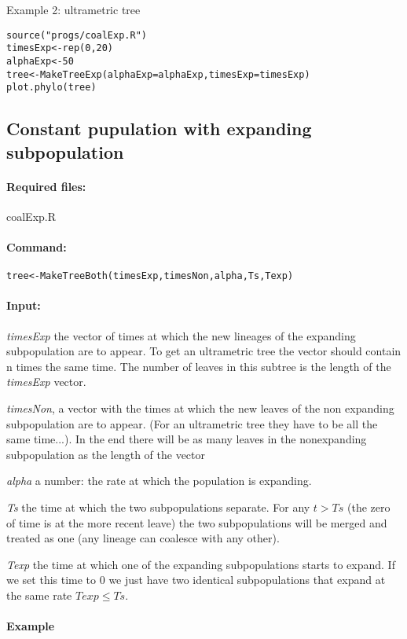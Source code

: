 \documentclass[12pt,a4paper]{article}
\begin{document}
Example 2: ultrametric tree

\begin{verbatim}
source("progs/coalExp.R")
timesExp<-rep(0,20)
alphaExp<-50
tree<-MakeTreeExp(alphaExp=alphaExp,timesExp=timesExp)
plot.phylo(tree)
\end{verbatim}


\subsection{Constant pupulation with expanding subpopulation}

\paragraph{Required files:} coalExp.R

\paragraph{Command:}
\verb!tree<-MakeTreeBoth(timesExp,timesNon,alpha,Ts,Texp)!

\paragraph{Input:}
\textit{timesExp} the vector of times at which the new lineages of the expanding subpopulation are to appear. To get an ultrametric tree the vector should contain n times the same time. The number of leaves in this subtree is the length of the \textit{timesExp} vector.

\textit{timesNon}, a vector with the times at which the new leaves of the non expanding subpopulation are to appear. (For an ultrametric tree they have to be all the same time...). In the end there will be as many leaves in the nonexpanding subpopulation as the length of the vector 


\textit{alpha} a number: the rate at which the population is expanding.

\textit{Ts} the time at which the two subpopulations separate. For any $t>Ts$ (the zero of time is at the more recent leave) the two subpopulations will be merged and treated as one (any lineage can coalesce with any other).

\textit{Texp} the time at which one of the expanding subpopulations starts to expand. If we set this time to 0 we just have two identical subpopulations that expand at the same rate
$Texp \leq Ts$.

\paragraph{Example}
\end{document}
